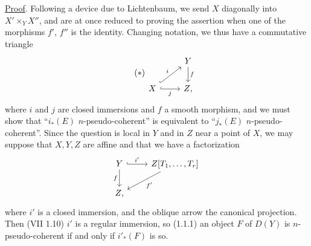 \uline{Proof}. Following a device due to Lichtenbaum, we send \(X\) diagonally into \(X'\times_YX''\), and are at once reduced to proving the assertion when one of the morphisms \(f'\), \(f''\) is the identity. Changing notation, we thus have a commutative triangle
\begin{equation}\tag{$*$}
\begin{tikzcd}
& Y \arrow[d,"f"]\\
X \arrow[r,hook,"j"'] \arrow[ur,hook,"i"] & Z{,}
\end{tikzcd}
\end{equation}
where \(i\) and \(j\) are closed immersions and \(f\) a smooth morphism, and we must show that ``\(i_*(E)\) \(n\)-pseudo-coherent'' is equivalent to ``\(j_*(E)\) \(n\)-pseudo-coherent''. Since the question is local in \(Y\) and in \(Z\) near a point of \(X\), we may suppose that \(X,Y,Z\) are affine and that we have a factorization
\[
\begin{tikzcd}
Y \arrow[r,hook,"i'"] \arrow[d,"f"'] & Z[T_1,\ldots,T_r]\arrow[dl,"f'"]\\
Z{,}&
\end{tikzcd}
\]
where \(i'\) is a closed immersion, and the oblique arrow the canonical projection. Then (VII 1.10) \(i'\) is a regular immersion, so (1.1.1) an object \(F\) of \(D(Y)\) is \(n\)-pseudo-coherent if and only if \(i'_*(F)\) is so.


